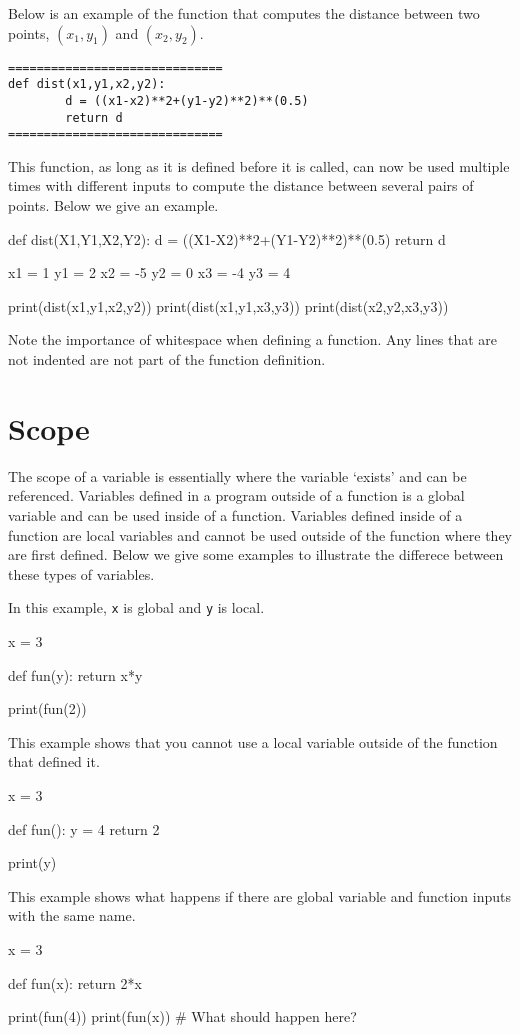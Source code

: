 \documentclass{ximera}
\begin{document}
Below is an example of the function that computes the distance between two points, $(x_1,y_1)$ and $(x_2,y_2)$.

\begin{verbatim}
==============================
def dist(x1,y1,x2,y2):
        d = ((x1-x2)**2+(y1-y2)**2)**(0.5)
        return d
==============================
\end{verbatim}

This function, as long as it is defined before it is called, can now be used multiple times with different inputs to compute the distance between several pairs of points. Below we give an example.

\begin{sageCell}
def dist(X1,Y1,X2,Y2):
        d = ((X1-X2)**2+(Y1-Y2)**2)**(0.5)
        return d

x1 = 1
y1 = 2
x2 = -5
y2 = 0
x3 = -4
y3 = 4

print(dist(x1,y1,x2,y2))
print(dist(x1,y1,x3,y3))
print(dist(x2,y2,x3,y3))
\end{sageCell}

Note the importance of whitespace when defining a function. Any lines that are not indented are not part of the function definition.

\section{Scope}

The scope of a variable is essentially where the variable `exists' and can be referenced. Variables defined in a program outside of a function is a global variable and can be used inside of a function. Variables defined inside of a function are local variables and cannot be used outside of the function where they are first defined. Below we give some examples to illustrate the differece between these types of variables.

In this example, \verb|x| is global and \verb|y| is local.

\begin{sageCell}
x = 3

def fun(y):
        return x*y

print(fun(2))
\end{sageCell}

This example shows that you cannot use a local variable outside of the function that defined it.

\begin{sageCell}
x = 3

def fun():
        y = 4
        return 2

print(y)
\end{sageCell}

This example shows what happens if there are global variable and function inputs with the same name.

\begin{sageCell}
x = 3

def fun(x):
	return 2*x

print(fun(4))
print(fun(x))     # What should happen here?
\end{sageCell}

\begin{question}
\end{question}

\begin{question}
\end{question}
\end{document}
